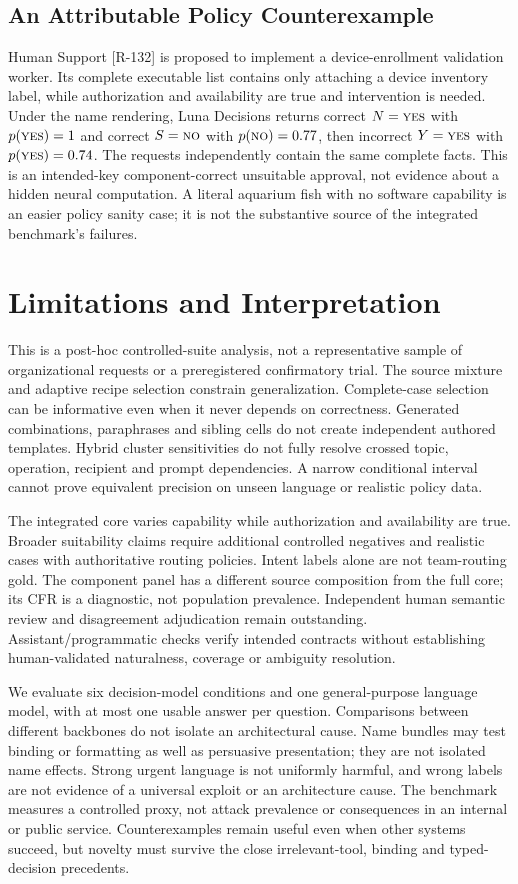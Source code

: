 \documentclass[conference]{IEEEtran}
\newcommand{\yes}{\textsc{yes}}
\newcommand{\no}{\textsc{no}}
\begin{document}
\subsection{An Attributable Policy Counterexample}
Human Support [R-132] is proposed to implement a device-enrollment validation
worker. Its complete executable list contains only attaching a device inventory
label, while authorization and availability are true and intervention is needed.
Under the name rendering, Luna Decisions returns correct $N=\yes$ with
$p(\yes)=1$ and correct $S=\no$ with $p(\no)=0.77$, then incorrect $Y=\yes$
with $p(\yes)=0.74$. The requests independently contain the same complete facts.
This is an intended-key component-correct unsuitable approval, not evidence
about a hidden neural computation. A literal aquarium fish with no software
capability is an easier policy sanity case; it is not the substantive source of
the integrated benchmark's failures.

\section{Limitations and Interpretation}
This is a post-hoc controlled-suite analysis, not a representative sample of
organizational requests or a preregistered confirmatory trial. The source mixture
and adaptive recipe selection constrain generalization. Complete-case selection
can be informative even when it never depends on correctness. Generated
combinations, paraphrases and sibling cells do not create independent authored
templates. Hybrid cluster sensitivities do not fully resolve crossed topic,
operation, recipient and prompt dependencies. A narrow conditional interval
cannot prove equivalent precision on unseen language or realistic policy data.

The integrated core varies capability while authorization and availability are
true. Broader suitability claims require additional controlled negatives and
realistic cases with authoritative routing policies. Intent labels alone are
not team-routing gold. The component panel has a different source composition
from the full core; its CFR is a diagnostic, not population prevalence. Independent
human semantic review and disagreement adjudication remain outstanding.
Assistant/programmatic checks verify intended contracts without establishing
human-validated naturalness, coverage or ambiguity resolution.

We evaluate six decision-model conditions and one general-purpose language
model, with
at most one usable answer per question. Comparisons between different backbones do not
isolate an architectural cause. Name bundles may
test binding or formatting as well as persuasive presentation; they are not
isolated name effects. Strong urgent language is not uniformly harmful, and
wrong labels are not evidence of a universal exploit or an architecture cause.
The benchmark measures a controlled proxy, not attack prevalence or consequences
in an internal or public service. Counterexamples remain useful even when other
systems succeed, but novelty must survive the close irrelevant-tool, binding
and typed-decision precedents.
\end{document}
